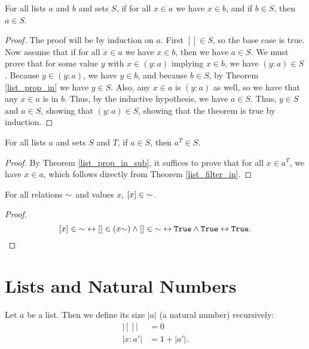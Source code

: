 \documentclass[../../math.tex]{subfiles}
\begin{document}
\begin{theorem} \label{list_prop_in_sub}
    For all lists $a$ and $b$ and sets $S$, if for all $x \in a$ we have $x \in
    b$, and if $b \in S$, then $a \in S$.
\end{theorem}
\begin{proof}
    The proof will be by induction on $a$.  First $[] \in S$, so the base case
    is true.  Now assume that if for all $x \in a$ we have $x \in b$, then we
    have $a \in S$.  We must prove that for some value $y$ with $x \in (y : a)$
    implying $x \in b$, we have $(y : a) \in S$.  Because $y \in (y : a)$, we
    have $y \in b$, and because $b \in S$, by Theorem \ref{list_prop_in} we have
    $y \in S$.  Also, any $x \in a$ is $(y : a)$ as well, so we have that any $x
    \in a$ is in $b$.  Thus, by the inductive hypothesis, we have $a \in S$.
    Thus, $y \in S$ and $a \in S$, showing that $(y : a) \in S$, showing that
    the theorem is true by induction.
\end{proof}

\begin{theorem} \label{list_prop_other_filter}
    For all lists $a$ and sets $S$ and $T$, if $a \in S$, then $a^T \in S$.
\end{theorem}
\begin{proof}
    By Theorem \ref{list_prop_in_sub}, it suffices to prove that for all $x \in
    a^T$, we have $x \in a$, which follows directly from Theorem
    \ref{list_filter_in}.
\end{proof}

\begin{theorem} \label{list_prop2_single}
    For all relations ${\sim}$ and values $x$, $[x] \in {\sim}$.
\end{theorem}
\begin{proof}
    \[
        [x] \in \usim
        \leftrightarrow [] \in (x\usim) \wedge [] \in \usim
        \leftrightarrow \vtt{True} \wedge \vtt{True}
        \leftrightarrow \vtt{True}.
    \]
\end{proof}

\section{Lists and Natural Numbers}

\begin{definition}
    Let $a$ be a list.  Then we define its size $|a|$ (a natural number)
    recursively:
    \begin{align*}
            |[]| &= 0 \\
        |x : a'| &= 1 + |a'|.
    \end{align*}
\end{definition}
\end{document}
